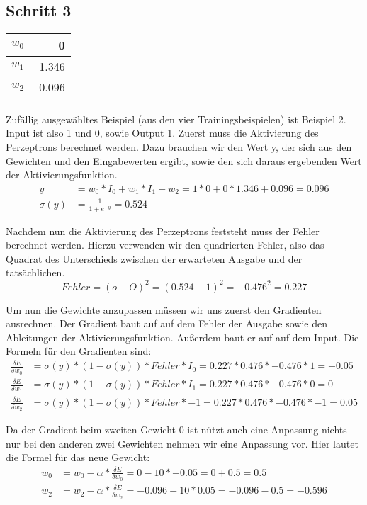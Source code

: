 \documentclass[a4paper]{article}
\begin{document}
\subsection{Schritt 3}
\begin{tabular}{|l|r|}
	\hline
	$w_0$ & 0 \\\hline
	$w_1$ & 1.346 \\\hline
	$w_2$ & -0.096 \\\hline
\end{tabular}
\paragraph{}
Zufällig ausgewähltes Beispiel (aus den vier Trainingsbeispielen) ist Beispiel 2. Input ist also 1 und 0, sowie Output 1.
Zuerst muss die Aktivierung des Perzeptrons berechnet werden. Dazu brauchen wir den Wert y, der sich aus den Gewichten und den Eingabewerten ergibt, sowie den sich daraus ergebenden Wert der Aktivierungsfunktion.
\begin{align*}
	y &= w_0 * I_0 + w_1 * I_1 - w_2 = 1 * 0 + 0 * 1.346 + 0.096 = 0.096 \\
	\sigma(y) &= \frac{1}{1 + e^{-y}} = 0.524
\end{align*}

Nachdem nun die Aktivierung des Perzeptrons feststeht muss der Fehler berechnet werden. Hierzu verwenden wir den quadrierten Fehler, also das Quadrat des Unterschieds zwischen der erwarteten Ausgabe und der tatsächlichen.
\[
	Fehler = (o - O)^2 = (0.524 - 1)^2 = -0.476^2 = 0.227
\]

Um nun die Gewichte anzupassen müssen wir uns zuerst den Gradienten ausrechnen.
Der Gradient baut auf auf dem Fehler der Ausgabe sowie den Ableitungen der Aktivierungsfunktion. Außerdem baut er auf auf dem Input. Die Formeln für den Gradienten sind:
\begin{align*}
	\frac{\delta E}{\delta w_0} &= \sigma(y) * (1 - \sigma(y)) * Fehler * I_0 = 0.227 * 0.476 * -0.476 * 1 = -0.05 \\
	\frac{\delta E}{\delta w_1} &= \sigma(y) * (1 - \sigma(y)) * Fehler * I_1 = 0.227 * 0.476 * -0.476 * 0 = 0 \\
	\frac{\delta E}{\delta w_2} &= \sigma(y) * (1 - \sigma(y)) * Fehler * -1 = 0.227 * 0.476 * -0.476 * -1 = 0.05
\end{align*}

Da der Gradient beim zweiten Gewicht 0 ist nützt auch eine Anpassung nichts - nur bei den anderen zwei Gewichten nehmen wir eine Anpassung vor. Hier lautet die Formel für das neue Gewicht:
\begin{align*}
	w_0 &= w_0 - \alpha * \frac{\delta E}{\delta w_0} = 0 - 10 * -0.05 = 0 + 0.5 = 0.5 \\
	w_2 &= w_2 - \alpha * \frac{\delta E}{\delta w_2} = -0.096 - 10 * 0.05 = -0.096 - 0.5 = -0.596
\end{align*}
\end{document}
